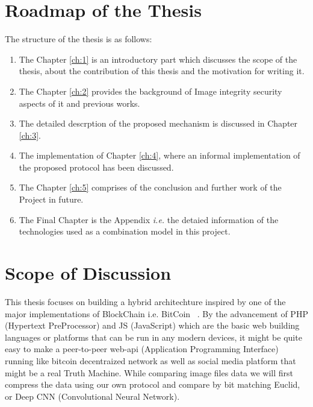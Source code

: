 \section{Roadmap of the Thesis}
\label{sec:structure}
The structure of the thesis is as follows:
\begin{enumerate}
\item The Chapter \ref{ch:1} is an introductory part which discusses the scope of the thesis, about the contribution of this thesis and the motivation for writing it.
\item The Chapter \ref{ch:2} provides the background of Image integrity security aspects of it and previous works.
\item The detailed descrption of the proposed mechanism is discussed in Chapter \ref{ch:3}.
\item The implementation of Chapter \ref{ch:4}, where an informal implementation of the proposed protocol has been discussed.
\item The Chapter \ref{ch:5} comprises of the conclusion and further work of the Project in future.
\item The Final Chapter is the Appendix \textit{i.e.} the detaied information of the technologies used as a combination model in this project.
\end{enumerate}

\section{Scope of Discussion}
This thesis focuses on building a hybrid architechture inspired by one of the major implementations of BlockChain i.e. BitCoin ~\cite{nakamoto2008bitcoin}. By the advancement of PHP (Hypertext PreProcessor) and JS (JavaScript) which are the basic web building languages or platforms that can be run in any modern devices, it might be quite easy to make a peer-to-peer web-api (Application Programming Interface) running like bitcoin decentraized network as well as social media platform that might be a real Truth Machine. While comparing image files data we will first compress the data using our own protocol and compare by bit matching Euclid, or Deep CNN (Convolutional Neural Network).

